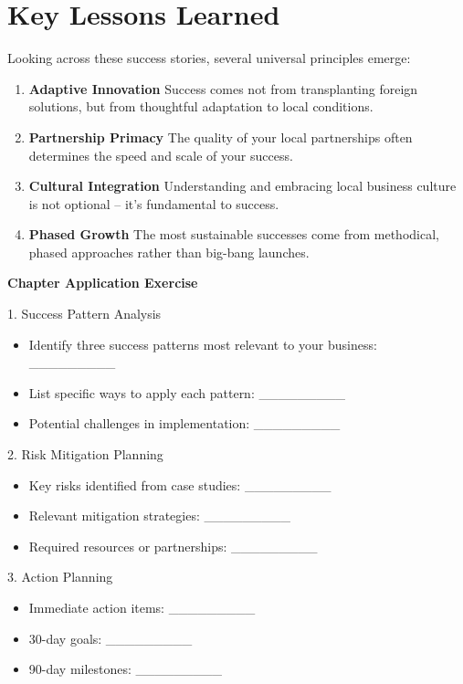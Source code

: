 \section{Key Lessons Learned}\label{sec:key-lessons-learned}

Looking across these success stories, several universal principles emerge:

\begin{tcolorbox}[colback=white,colframe=primarydark,title=\textbf{Universal Success Principles}]
\begin{enumerate}
    \item \textbf{Adaptive Innovation}
    Success comes not from transplanting foreign solutions, but from thoughtful adaptation to local conditions.

    \item \textbf{Partnership Primacy}
    The quality of your local partnerships often determines the speed and scale of your success.

    \item \textbf{Cultural Integration}
    Understanding and embracing local business culture is not optional – it's fundamental to success.

    \item \textbf{Phased Growth}
    The most sustainable successes come from methodical, phased approaches rather than big-bang launches.
\end{enumerate}
\end{tcolorbox}

\begin{workshopbox}
\textbf{Chapter Application Exercise}

1. Success Pattern Analysis
\begin{itemize}
    \item Identify three success patterns most relevant to your business: \_\_\_\_\_\_\_\_\_
    \item List specific ways to apply each pattern: \_\_\_\_\_\_\_\_\_
    \item Potential challenges in implementation: \_\_\_\_\_\_\_\_\_
\end{itemize}

2. Risk Mitigation Planning
\begin{itemize}
    \item Key risks identified from case studies: \_\_\_\_\_\_\_\_\_
    \item Relevant mitigation strategies: \_\_\_\_\_\_\_\_\_
    \item Required resources or partnerships: \_\_\_\_\_\_\_\_\_
\end{itemize}

3. Action Planning
\begin{itemize}
    \item Immediate action items: \_\_\_\_\_\_\_\_\_
    \item 30-day goals: \_\_\_\_\_\_\_\_\_
    \item 90-day milestones: \_\_\_\_\_\_\_\_\_
\end{itemize}
\end{workshopbox}

